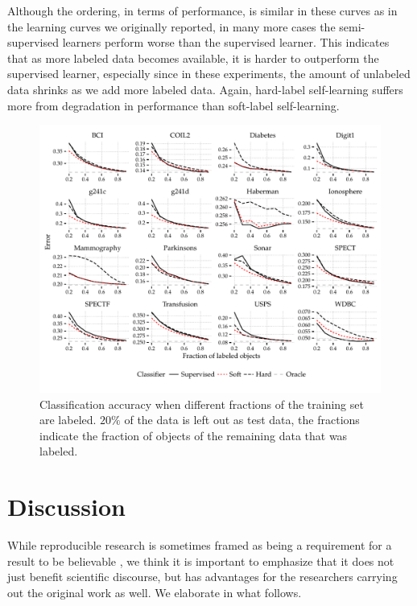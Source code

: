 \documentclass[runningheads,a4paper]{llncs}\usepackage[]{graphicx}\usepackage[]{color}
\makeatletter
\def\maxwidth{ %
  \ifdim\Gin@nat@width>\linewidth
    \linewidth
  \else
    \Gin@nat@width
  \fi
}
\newenvironment{knitrout}{}{} %
\makeatother
\begin{document}
Although the ordering, in terms of performance, is similar in these curves as in the learning curves we originally reported, in many more cases the semi-supervised learners perform worse than the supervised learner. This indicates that as more labeled data becomes available, it is harder to outperform the supervised learner, especially since in these experiments, the amount of unlabeled data shrinks as we add more labeled data. Again, hard-label self-learning suffers more from degradation in performance than soft-label self-learning.

\begin{knitrout}
\color{fgcolor}\begin{figure}
\includegraphics[width=\maxwidth]{figure/learningcurves-frac-1} \caption[Classification accuracy when different fractions of the training set are labeled]{Classification accuracy when different fractions of the training set are labeled. $20\%$ of the data is left out as test data, the fractions indicate the fraction of objects of the remaining data that was labeled.}\label{fig:learningcurves-frac}
\end{figure}


\end{knitrout}

\section{Discussion}
While reproducible research is sometimes framed as being a requirement for a result to be believable \cite{Goodman2016a}, we think it is important to emphasize that it does not just benefit scientific discourse, but has advantages for the researchers carrying out the original work as well. We elaborate in what follows.
\end{document}
